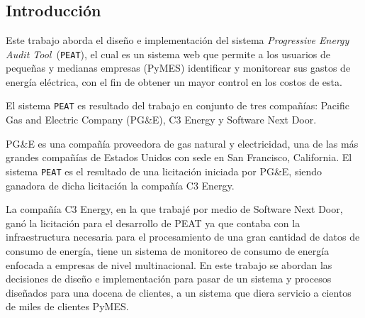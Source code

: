 \documentclass[letterpaper,twoside,openright]{book}
\begin{document}
\tableofcontents

\chapter*{}
\section*{Introducción}
Este trabajo aborda el diseño e implementación del sistema \textit{Progressive
  Energy Audit Tool}\ (\texttt{PEAT}), el cual es un sistema web que permite
a los usuarios de pequeñas y medianas empresas (PyMES) identificar y monitorear
sus gastos de energía eléctrica, con el fin de obtener un mayor control
en los costos de esta.

El sistema \texttt{PEAT} es resultado del trabajo en conjunto de tres compañías:
Pacific Gas and Electric Company (PG\&E), C3 Energy y Software Next Door.

PG\&E es una compañía proveedora de gas natural y electricidad, una de las
más grandes compañías de Estados Unidos con sede en San Francisco, California.
El sistema \texttt{PEAT} es el resultado de una licitación iniciada por PG\&E,
siendo ganadora de dicha licitación la compañía C3 Energy.

La compañía C3 Energy, en la que trabajé por medio de Software Next Door, ganó
la licitación para el desarrollo de PEAT ya que contaba con la infraestructura
necesaria para el procesamiento de una gran cantidad de datos de consumo
de energía, tiene un sistema de monitoreo de consumo de energía enfocada a
empresas de nivel multinacional. En este trabajo se abordan las decisiones de
diseño e implementación para pasar de un sistema y procesos diseñados
para una docena de clientes, a un sistema que diera servicio a cientos
de miles de clientes PyMES.


\mainmatter




\backmatter


\end{document}
